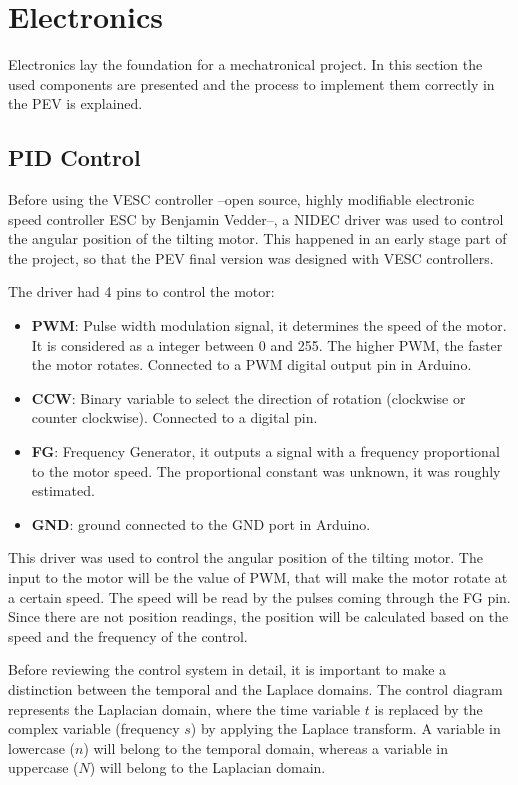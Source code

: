 \newpage
\section{Electronics}
Electronics lay the foundation for a mechatronical project. In this section the used components are presented and the process to implement them correctly in the PEV is explained.
\subsection{PID Control}
Before using the VESC controller --open source, highly modifiable electronic speed controller ESC by Benjamin Vedder--, a NIDEC driver was used to control the angular position of the tilting motor. This happened in an early stage part of the project, so that the PEV final version was designed with VESC controllers.

The driver had 4 pins to control the motor:
\begin{itemize}
\begin{itemize}
	\item \textbf{PWM}: Pulse width modulation signal, it determines the speed of the motor. It is considered as a integer between 0 and 255. The higher PWM, the faster the motor rotates. Connected to a PWM digital output pin in Arduino.
	\item \textbf{CCW}: Binary variable to select the direction of rotation (clockwise or counter clockwise). Connected to a digital pin.
	\item \textbf{FG}: Frequency Generator, it outputs a signal with a frequency proportional to the motor speed. The proportional constant was unknown, it was roughly estimated.
	\item \textbf{GND}: ground connected to the GND port in Arduino.
\end{itemize}
\end{itemize}

This driver was used to control the angular position of the tilting motor. The input to the motor will be the value of PWM, that will make the motor rotate at a certain speed. The speed will be read by the pulses coming through the FG pin. Since there are not position readings, the position will be calculated based on the speed and the frequency of the control. 

Before reviewing the control system in detail, it is important to make a distinction between the temporal and the Laplace domains. The control diagram represents the Laplacian domain, where the time variable $t$ is replaced by the complex variable (frequency $s$) by applying the Laplace transform. A variable in lowercase ($n$) will belong to the temporal domain, whereas a variable in uppercase ($N$) will belong to the Laplacian domain.

